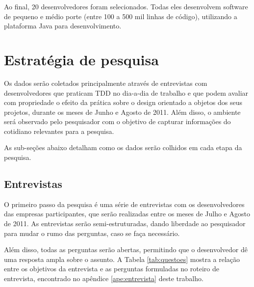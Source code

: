Ao final, 20 desenvolvedores foram selecionados. Todas eles desenvolvem software de
pequeno e médio porte (entre 100 a 500 mil linhas
de código), utilizando a plataforma Java para desenvolvimento. 

\section{Estratégia de pesquisa} 
\label{sec:planejamento-estrategia}

Os dados serão coletados principalmente através de entrevistas com
desenvolvedores que praticam TDD no dia-a-dia de trabalho e que podem avaliar
com propriedade o efeito da prática sobre o design orientado a objetos dos seus 
projetos, durante os meses de Junho e Agosto de 2011. 
Além disso, o ambiente será observado pelo pesquisador com o objetivo de capturar
informações do cotidiano relevantes para a pesquisa.

As sub-seções abaixo detalham como os dados serão colhidos em cada etapa da pesquisa.

\subsection{Entrevistas}
\label{sec:planejamento-estrategia-entrevistas}

O primeiro passo da pesquisa é uma série de entrevistas com os desenvolvedores 
das empresas participantes, que serão realizadas entre os meses de Julho e
Agosto de 2011. As entrevistas serão semi-estruturadas, dando liberdade ao
pesquisador para mudar o rumo das perguntas, caso se faça necessário.

Além disso, todas as perguntas serão abertas, permitindo que o desenvolvedor dê
uma resposta ampla sobre o assunto. A Tabela \ref{tab:questoes} mostra a
relação entre os objetivos da entrevista e as perguntas formuladas no roteiro de
entrevista, encontrado no apêndice \ref{ape:entrevista} deste trabalho.

